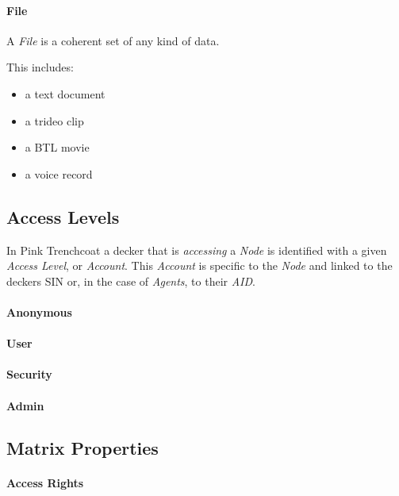 \paragraph{File}
\label{par:file}

A \emph{File} is a coherent set of any kind of data.

This includes:

\begin{itemize}[parsep=0em]
    \item a text document
    \item a trideo clip
    \item a BTL movie
    \item a voice record
\end{itemize}


\subsection{Access Levels}

In Pink Trenchcoat a decker that is \emph{accessing} a \emph{Node} is identified
with a given \emph{Access Level}, or \emph{Account}. This \emph{Account} is
specific to the \emph{Node} and linked to the deckers SIN or, in the case of
\emph{Agents}, to their \emph{AID}.


\paragraph{Anonymous}
\paragraph{User}
\paragraph{Security}
\paragraph{Admin}

\subsection{Matrix Properties}
\paragraph{Access Rights}

